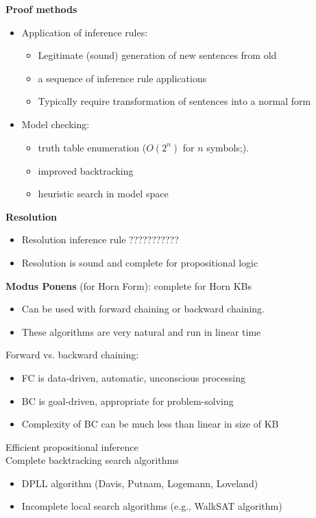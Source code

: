 \documentclass{../cheat}
\begin{document}
\begin{multicols}{3}
 		\textbf{Proof methods}
 		\begin{itemize}
 			\item Application of inference rules:
 			\begin{itemize}
 				\item Legitimate (sound) generation of new sentences from old
 				\item a sequence of inference rule applications 
 				\item Typically require transformation of sentences into a normal form 
 			\end{itemize}
 			\item Model checking:
 			\begin{itemize}
 				\item truth table enumeration ($O(2^n)$ for $n$ symbols;).
 				\item improved backtracking
 				\item heuristic search in model space
 			\end{itemize}
 		\end{itemize}
 		
 		\textbf{Resolution}
 		\begin{itemize}
 			\item Resolution inference rule  ???????????
 			\item Resolution is sound and complete for propositional logic 
  		\end{itemize}

		
		\textbf{Modus Ponens} (for Horn Form): complete for Horn KBs
		\begin{itemize}
 			\item Can be used with forward chaining or backward chaining.
			\item These algorithms are very natural and run in linear time			
		\end{itemize}

  		Forward vs. backward chaining:
 		\begin{itemize}
 			\item FC is data-driven, automatic, unconscious processing
 			\item BC is goal-driven, appropriate for problem-solving
 			\item Complexity of BC can be much less than linear in size of KB
 		\end{itemize}
 		
 		Efficient propositional inference\\
 		Complete backtracking search algorithms
 		\begin{itemize}
 			\item DPLL algorithm (Davis, Putnam, Logemann, Loveland)
 			\item Incomplete local search algorithms (e.g., WalkSAT algorithm)
 		\end{itemize}



\end{multicols}
\end{document}
